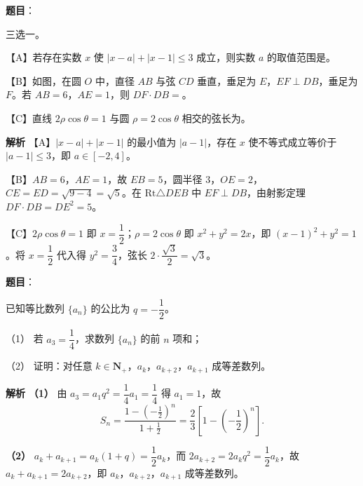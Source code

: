\begin{answer}

\textbf{题目}：

三选一。

【A】若存在实数 $x$ 使 $|x-a|+|x-1|\leqslant3$ 成立，则实数 $a$ 的取值范围是\gkblank{}。

【B】如图，在圆 $O$ 中，直径 $AB$ 与弦 $CD$ 垂直，垂足为 $E$，$EF\perp DB$，垂足为 $F$。若 $AB=6$，$AE=1$，则 $DF\cdot DB=$\gkblank{}。
\nopagebreak[4]
\begin{center}\end{center}
\nopagebreak[4]
【C】直线 $2\rho\cos\theta=1$ 与圆 $\rho=2\cos\theta$ 相交的弦长为\gkblank{}。

\textbf{解析}
【A】$|x-a|+|x-1|$ 的最小值为 $|a-1|$，存在 $x$ 使不等式成立等价于 $|a-1|\leqslant3$，即 $a\in[-2,4]$。

【B】$AB=6$，$AE=1$，故 $EB=5$，圆半径 $3$，$OE=2$，$CE=ED=\sqrt{9-4}=\sqrt5$。在 $\mathrm{Rt}\triangle DEB$ 中 $EF\perp DB$，由射影定理 $DF\cdot DB=DE^2=5$。

【C】$2\rho\cos\theta=1$ 即 $x=\dfrac12$；$\rho=2\cos\theta$ 即 $x^2+y^2=2x$，即 $(x-1)^2+y^2=1$。将 $x=\dfrac12$ 代入得 $y^2=\dfrac34$，弦长 $2\cdot\dfrac{\sqrt3}2=\sqrt3$。


\end{answer}
\begin{answer}

\textbf{题目}：

已知等比数列 $\{a_n\}$ 的公比为 $q=-\dfrac12$。

（1） 若 $a_3=\dfrac14$，求数列 $\{a_n\}$ 的前 $n$ 项和；

（2） 证明：对任意 $k\in\mathbf N_+$，$a_k$，$a_{k+2}$，$a_{k+1}$ 成等差数列。

\textbf{解析}
\textbf{（1）} 由 $a_3=a_1q^2=\dfrac14a_1=\dfrac14$ 得 $a_1=1$，故
\nopagebreak[4]
\[S_n=\frac{1-\left(-\frac12\right)^n}{1+\frac12}=\frac23\left[1-\left(-\frac12\right)^n\right].\]

\textbf{（2）} $a_k+a_{k+1}=a_k(1+q)=\dfrac12a_k$，而 $2a_{k+2}=2a_kq^2=\dfrac12a_k$，故 $a_k+a_{k+1}=2a_{k+2}$，即 $a_k$，$a_{k+2}$，$a_{k+1}$ 成等差数列。



\end{answer}

